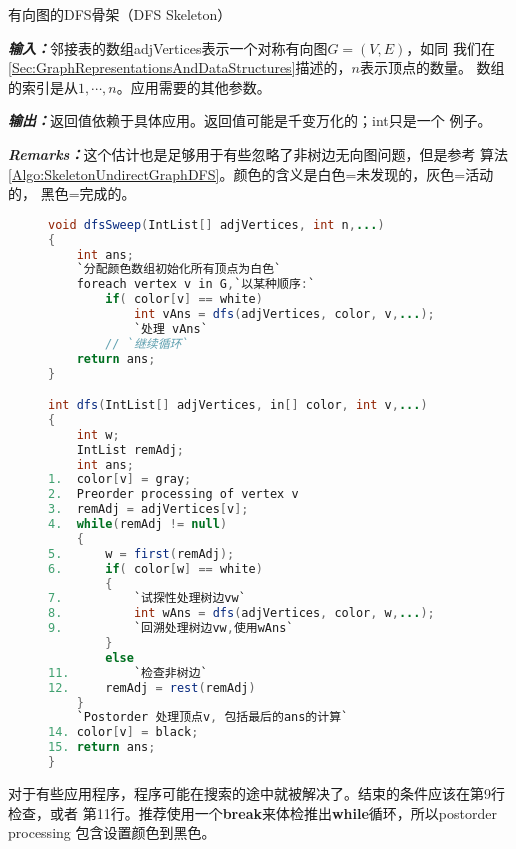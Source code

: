 \begin{algorithm}\label{Algo:SkeletonDirectGraphDFS}
有向图的DFS骨架（DFS Skeleton）

{\textbf{\emph{输入：}}}邻接表的数组adjVertices表示一个对称有向图$G=(V,E)$，如同
我们在\ref{Sec:GraphRepresentationsAndDataStructures}描述的，$n$表示顶点的数量。
数组的索引是从$1, \cdots, n$。应用需要的其他参数。

{\textbf{\emph{输出：}}}返回值依赖于具体应用。返回值可能是千变万化的；int只是一个
例子。

{\textbf{\emph{Remarks：}}}这个估计也是足够用于有些忽略了非树边无向图问题，但是参考
算法\ref{Algo:SkeletonUndirectGraphDFS}。颜色的含义是白色=未发现的，灰色=活动的，
黑色=完成的。

\end{algorithm}

\begin{figure}
\begin{lstlisting}[language={Java},keywordstyle=\color{blue!70}, commentstyle=\color{red!50!green!50!blue!50}]
void dfsSweep(IntList[] adjVertices, int n,...)
{
    int ans;
    `分配颜色数组初始化所有顶点为白色`
    foreach vertex v in G,`以某种顺序:`
        if( color[v] == white)
            int vAns = dfs(adjVertices, color, v,...);
            `处理 vAns`
        // `继续循环`
    return ans;
}

int dfs(IntList[] adjVertices, in[] color, int v,...)
{
    int w;
    IntList remAdj;
    int ans;
1.  color[v] = gray;
2.  Preorder processing of vertex v
3.  remAdj = adjVertices[v];
4.  while(remAdj != null)
    {
5.      w = first(remAdj);
6.      if( color[w] == white)
        {
7.          `试探性处理树边vw`
8.          int wAns = dfs(adjVertices, color, w,...);
9.          `回溯处理树边vw,使用wAns`
        }
        else
11.         `检查非树边`
12.     remAdj = rest(remAdj)
    }
    `Postorder 处理顶点v, 包括最后的ans的计算`
14. color[v] = black;
15. return ans;
}
\end{lstlisting}
\end{figure}

对于有些应用程序，程序可能在搜索的途中就被解决了。结束的条件应该在第9行检查，或者
第11行。推荐使用一个\textbf{break}来体检推出\textbf{while}循环，所以postorder processing
包含设置颜色到黑色。



